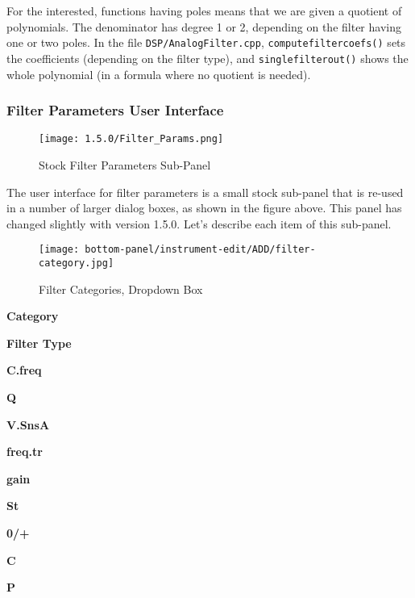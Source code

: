    For the interested, functions having poles means that we are given a
   quotient of polynomials. The denominator has degree 1 or 2, depending on the
   filter having one or two poles. In the file \texttt{DSP/AnalogFilter.cpp},
   \texttt{computefiltercoefs()} sets the coefficients
   (depending on the filter type), and
   \texttt{singlefilterout()} shows
   the whole polynomial (in a formula where no quotient is needed).

\subsubsection{Filter Parameters User Interface}
\label{subsubsec:filter_parameters_user_interface}

\begin{figure}[H]
   \centering 
   \texttt{[image: 1.5.0/Filter\_Params.png]}
   \caption[Filter Parameters Sub-panel]{Stock Filter Parameters Sub-Panel}
   \label{fig:filter_parameters_subpanel} 
\end{figure}

   The user interface for filter parameters is a small stock sub-panel that
   is re-used in a number of larger dialog boxes, as shown in the figure
   above.  This panel has changed slightly with version 1.5.0.
   Let's describe each item of this sub-panel.


\begin{figure}[H]
   \centering 
   \texttt{[image: bottom-panel/instrument-edit/ADD/filter-category.jpg]}
   \caption[Filter Categories Dropdown]{Filter Categories, Dropdown Box}
   \label{fig:filter_categories_dropdown} 
\end{figure}

   \begin{enumber}
      \item \textbf{Category}
      \item \textbf{Filter Type}
      \item \textbf{C.freq}
      \item \textbf{Q}
      \item \textbf{V.SnsA}
      \item \textbf{freq.tr}
      \item \textbf{gain}
      \item \textbf{St}
      \item \textbf{0/+}
      \item \textbf{C}
      \item \textbf{P}
   \end{enumber}

